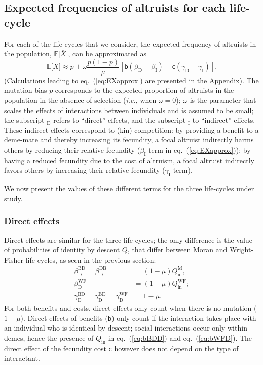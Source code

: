 \documentclass[11pt, letterpaper]{article}
\renewcommand{\eqref}[1]{\textup{{\normalfont eq.~(\ref{#1}}\normalfont)}}
\newcommand{\ie}{\textit{i.e.}}
\newcommand{\Esp}[1]{\mathbb{E}\big[ #1\big]}%
\newcommand{\appname}[0]{Appendix}
\newcommand{\bb}{\mathsf{b}}
\newcommand{\cc}{\mathsf{c}}
\newcommand{\direct}{\mathrm{D}}
\newcommand{\indirect}{\mathrm{I}}
\newcommand{\Moran}{\textrm{M}}
\newcommand{\BD}{\textrm{BD}}
\newcommand{\DB}{\textrm{DB}}
\newcommand{\WF}{\textrm{WF}}
\newcommand{\Qin}{Q_{\textrm{in}}}
\begin{document}
\clearpage
\subsection{Expected frequencies of altruists for each life-cycle}

For each of the life-cycles that we consider, the expected frequency of altruists in the population, $\Esp{\overline{X}}$, can be approximated as
\begin{equation}\label{eq:EXapprox}
\Esp{\overline{X}} \approx p + \omega \frac{p (1-p)}{\mu} \left[ \bb \left( \beta_{\direct} - \beta_{\indirect} \right) - \cc \left( \gamma_{\direct} - \gamma_{\indirect} \right) \right].
\end{equation}
(Calculations leading to \eqref{eq:EXapprox} are presented in the \appname). The mutation bias $p$ corresponds to the expected proportion of altruists in the population in the absence of selection (\ie, when $\omega = 0$); $\omega$ is the parameter that scales the effects of interactions between individuals and is assumed to be small; the subscript $_{\direct}$ refers to ``direct'' effects, and the subscript $_{\indirect}$ to ``indirect'' effects. These indirect effects correspond to (kin) competition: by providing a benefit to a deme-mate and thereby increasing its fecundity, a focal altruist indirectly harms others by reducing their relative fecundity ($\beta_{\indirect}$ term in \eqref{eq:EXapprox}); by having a reduced fecundity due to the cost of altruism, a focal altruist indirectly favors others by increasing their relative fecundity ($\gamma_{\indirect}$ term).

We now present the values of these different terms for the three life-cycles under study.  

\subsubsection{Direct effects}
Direct effects are similar for the three life-cycles; the only difference is the value of probabilities of identity by descent $Q$, that differ between Moran and Wright-Fisher life-cycles, as seen in the previous section:
%
\begin{subequations}\label{eq:directeffects}
\begin{align}
\beta_{\direct}^{\BD} = \beta_{\direct}^{\DB} &= \left( 1-\mu\right) \Qin^{\Moran}, \label{eq:bBDD}\\
\beta_{\direct}^{\WF} &= \left( 1-\mu\right) \Qin^{\WF}; \label{eq:bWFD}\\
%
%
\gamma_{\direct}^{\BD} = \gamma_{\direct}^{\BD} = \gamma_{\direct}^{\WF} &= 1-\mu.\label{eq:cBDD}
\end{align}
\end{subequations}
%
For both benefits and costs, direct effects only count when there is no mutation ($1-\mu$). Direct effects of benefits ($\bb$) only count if the interaction takes place with an individual who is identical by descent; social interactions occur only within demes, hence the presence of $\Qin$ in \eqref{eq:bBDD} and \eqref{eq:bWFD}. The direct effect of the fecundity cost $\cc$ however does not depend on the type of interactant. 
\end{document}
